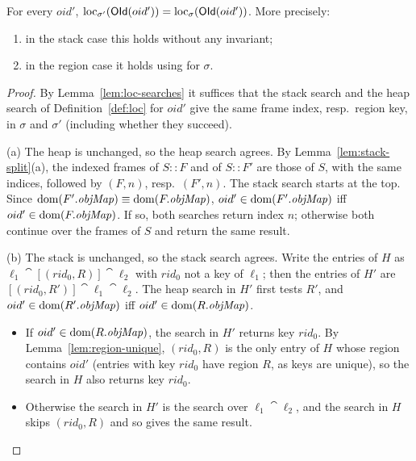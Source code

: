 \begin{lemma}
\label{lem:fieldAsgn-loc}
For every $oid'$, $\mathrm{loc}_{\sigma'}(\mathsf{OId}(oid')) = \mathrm{loc}_{\sigma}(\mathsf{OId}(oid'))$. 
More precisely:
\begin{enumerate}[nosep,label=(\alph*)]
  \item in the stack case this holds without any invariant;
  \item in the region case it holds using  for $\sigma$.
\end{enumerate}
\end{lemma}
\begin{proof}
By Lemma~\ref{lem:loc-searches} it suffices that the stack search and the heap search of
Definition~\ref{def:loc} for $oid'$ give the same frame index, resp.\ region key, in $\sigma$ and
$\sigma'$ (including whether they succeed).

(a) The heap is unchanged, so the heap search agrees. By Lemma~\ref{lem:stack-split}(a), the indexed
frames of $S :: F$ and of $S :: F'$ are those of $S$, with the same indices, followed by $(F, n)$,
resp.\ $(F', n)$. The stack search starts at the top. Since $\mathrm{dom}(F'.\mathit{objMap}) \equiv \mathrm{dom}(F.\mathit{objMap})$,
$oid' \in \mathrm{dom}(F'.\mathit{objMap})$ iff $oid' \in \mathrm{dom}(F.\mathit{objMap})$. If so, both searches return index $n$;
otherwise both continue over the frames of $S$ and return the same result.

(b) The stack is unchanged, so the stack search agrees. Write the entries of $H$ as
$\ell_1 \cat [(rid_0, R)] \cat \ell_2$ with $rid_0$ not a key of $\ell_1$; then the entries of $H'$
are $[(rid_0, R')] \cat \ell_1 \cat \ell_2$. The heap search in $H'$ first tests $R'$, and
$oid' \in \mathrm{dom}(R'.\mathit{objMap})$ iff $oid' \in \mathrm{dom}(R.\mathit{objMap})$.
\begin{itemize}[nosep]
  \item If $oid' \in \mathrm{dom}(R.\mathit{objMap})$, the search in $H'$ returns key $rid_0$. By
    Lemma~\ref{lem:region-unique}, $(rid_0, R)$ is the only entry of $H$ whose region contains
    $oid'$ (entries with key $rid_0$ have region $R$, as keys are unique), so the search in $H$ also
    returns key $rid_0$.
  \item Otherwise the search in $H'$ is the search over $\ell_1 \cat \ell_2$, and the search in $H$
    skips $(rid_0, R)$ and so gives the same result. \qedhere
\end{itemize}
\end{proof}

